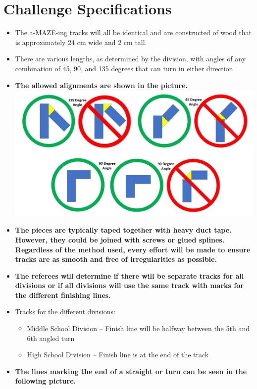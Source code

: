 \documentclass[a4paper,12pt]{article}
\begin{document}
\section{Challenge Specifications}
\begin{itemize}
\item The a-MAZE-ing tracks will all be identical and are constructed of wood that is approximately
24 cm wide and 2 cm tall.
\item There are various lengths, as determined by the division, with angles
of any combination of 45, 90, and 135 degrees that can turn in either direction.
\item \textbf{The allowed alignments are shown in the picture. \\}
\includegraphics[width=1.0\textwidth]{amazeing_allowed.png}
\item \textbf{The pieces are typically taped together with heavy duct tape. However, they could be
joined with screws or glued splines. Regardless of the method used, every effort will be
made to ensure tracks are as smooth and free of irregularities as possible.}
\item \textbf{The referees will determine if there will be separate tracks for all divisions or if all
divisions will use the same track with marks for the different finishing lines.}
\item Tracks for the different divisions:
\begin{itemize}
\item Middle School Division – Finish line will be halfway between the 5th and 6th angled turn
\item High School Division – Finish line is at the end of the track
\end{itemize}
\item \textbf{The lines marking the end of a straight or turn can be seen in the following picture.\\}

\end{itemize}
\end{document}
